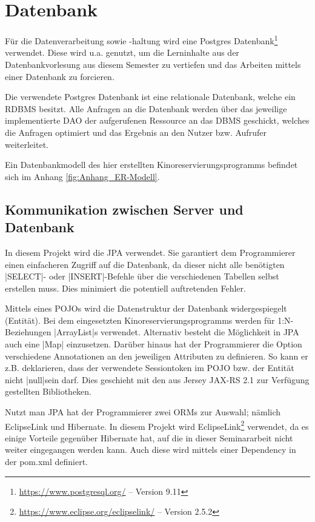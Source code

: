 \section{Datenbank}
\label{sec:datenbank}

Für die Datenverarbeitung sowie -haltung wird eine Postgres Datenbank\footnote{\url{https://www.postgresql.org/} -- Version 9.11} verwendet.
Diese wird u.a. genutzt, um die Lerninhalte aus der Datenbankvorlesung aus diesem Semester zu vertiefen und das Arbeiten mittels einer Datenbank zu forcieren.

Die verwendete Postgres Datenbank ist eine relationale Datenbank, welche ein \acf{RDBMS} besitzt.
Alle Anfragen an die Datenbank werden über das jeweilige implementierte \acs{DAO} der aufgerufenen Ressource an das \acs{DBMS} geschickt, welches die Anfragen optimiert und das Ergebnis an den Nutzer bzw. Aufrufer weiterleitet.

Ein Datenbankmodell des hier erstellten Kinoreservierungsprogramms befindet sich im Anhang \vref{fig:Anhang_ER-Modell}.

\subsection{Kommunikation zwischen Server und Datenbank}
\label{ssec:jpa}
\authorsection{\authorSG}

In diesem Projekt wird die \ac{JPA} verwendet.
Sie garantiert dem Programmierer einen einfacheren Zugriff auf die Datenbank, da dieser nicht alle benötigten \sinline |SELECT|- oder \sinline |INSERT|-Befehle über die verschiedenen Tabellen selbst erstellen muss.
Dies minimiert die potentiell auftretenden Fehler.

Mittels eines \acp{POJO} wird die Datenstruktur der Datenbank widergespiegelt (Entität).
Bei dem eingesetzten Kinoreservierungsprogramms werden für 1:N-Beziehungen \jinline|ArrayList|s verwendet.
Alternativ besteht die Möglichkeit in \ac{JPA} auch eine \jinline|Map| einzusetzen.
Darüber hinaus hat der Programmierer die Option verschiedene Annotationen an den jeweiligen Attributen zu definieren.
So kann er z.B. deklarieren, dass der verwendete Sessiontoken im \ac{POJO} bzw. der Entität nicht \jinline|null|sein darf.
Dies geschieht mit den aus Jersey JAX-RS 2.1 zur Verfügung gestellten Bibliotheken.

Nutzt man \ac{JPA} hat der Programmierer zwei \acp{ORM} zur Auswahl; nämlich EclipseLink und Hibernate.
In diesem Projekt wird EclipseLink\footnote{\url{https://www.eclipse.org/eclipselink/} -- Version 2.5.2} verwendet, da es einige Vorteile gegenüber Hibernate hat, auf die in dieser Seminararbeit nicht weiter eingegangen werden kann.
Auch diese wird mittels einer Dependency in der pom.xml definiert.


